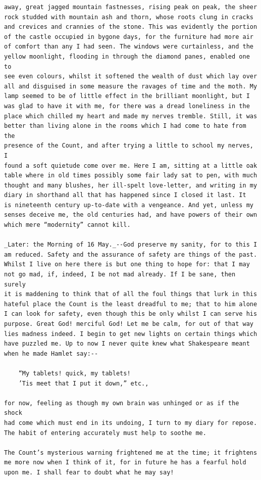 \documentclass{article}
\begin{document}
\begin{verbatim}
away, great jagged mountain fastnesses, rising peak on peak, the sheer
rock studded with mountain ash and thorn, whose roots clung in cracks
and crevices and crannies of the stone. This was evidently the portion
of the castle occupied in bygone days, for the furniture had more air
of comfort than any I had seen. The windows were curtainless, and the
yellow moonlight, flooding in through the diamond panes, enabled one to
see even colours, whilst it softened the wealth of dust which lay over
all and disguised in some measure the ravages of time and the moth. My
lamp seemed to be of little effect in the brilliant moonlight, but I
was glad to have it with me, for there was a dread loneliness in the
place which chilled my heart and made my nerves tremble. Still, it was
better than living alone in the rooms which I had come to hate from the
presence of the Count, and after trying a little to school my nerves, I
found a soft quietude come over me. Here I am, sitting at a little oak
table where in old times possibly some fair lady sat to pen, with much
thought and many blushes, her ill-spelt love-letter, and writing in my
diary in shorthand all that has happened since I closed it last. It
is nineteenth century up-to-date with a vengeance. And yet, unless my
senses deceive me, the old centuries had, and have powers of their own
which mere “modernity” cannot kill.

_Later: the Morning of 16 May._--God preserve my sanity, for to this I
am reduced. Safety and the assurance of safety are things of the past.
Whilst I live on here there is but one thing to hope for: that I may
not go mad, if, indeed, I be not mad already. If I be sane, then surely
it is maddening to think that of all the foul things that lurk in this
hateful place the Count is the least dreadful to me; that to him alone
I can look for safety, even though this be only whilst I can serve his
purpose. Great God! merciful God! Let me be calm, for out of that way
lies madness indeed. I begin to get new lights on certain things which
have puzzled me. Up to now I never quite knew what Shakespeare meant
when he made Hamlet say:--

    “My tablets! quick, my tablets!
    ’Tis meet that I put it down,” etc.,

for now, feeling as though my own brain was unhinged or as if the shock
had come which must end in its undoing, I turn to my diary for repose.
The habit of entering accurately must help to soothe me.

The Count’s mysterious warning frightened me at the time; it frightens
me more now when I think of it, for in future he has a fearful hold
upon me. I shall fear to doubt what he may say!


\end{verbatim}
\end{document}
